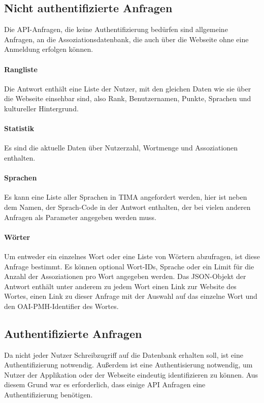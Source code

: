 \subsection{Nicht authentifizierte Anfragen}
Die API-Anfragen, die keine Authentifizierung bedürfen sind allgemeine Anfragen, an die Assoziationsdatenbank, die auch über die Webseite ohne eine Anmeldung erfolgen können.

\paragraph{Rangliste} Die Antwort enthält eine Liste der Nutzer, mit den gleichen Daten wie sie über die Webseite einsehbar sind, also Rank, Benutzernamen, Punkte, Sprachen und kultureller Hintergrund.

\paragraph{Statistik} Es sind die aktuelle Daten über Nutzerzahl, Wortmenge und Assoziationen enthalten.

\paragraph{Sprachen} Es kann eine Liste aller Sprachen in TIMA angefordert werden, hier ist neben dem Namen, der Sprach-Code in der Antwort enthalten, der bei vielen anderen Anfragen als Parameter angegeben werden muss.

\paragraph{Wörter} Um entweder ein einzelnes Wort oder eine Liste von Wörtern abzufragen, ist diese Anfrage bestimmt. Es können optional Wort-IDs, Sprache oder ein Limit für die Anzahl der Assoziationen pro Wort angegeben werden. Das JSON-Objekt der Antwort enthält unter anderem zu jedem Wort einen Link zur Website des Wortes, einen Link zu dieser Anfrage mit der Auswahl auf das einzelne Wort und den OAI-PMH-Identifier des Wortes.

\subsection{Authentifizierte Anfragen}\label{subsec:authentifizierte_anfragen}
Da nicht jeder Nutzer Schreibzugriff auf die Datenbank erhalten soll, ist eine Authentifizierung notwendig. Außerdem ist eine Authentisierung notwendig, um Nutzer der Applikation oder der Webseite eindeutig identifizieren zu können. Aus diesem Grund war es erforderlich, dass einige API Anfragen eine Authentifizierung benötigen.

